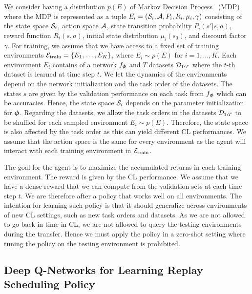 We consider having a distribution $p(E)$ of Markov Decision Process~\cite{bellman1957markovian} (MDP) where the MDP is represented as a tuple $E_i = ({\mathcal{S}}_i, {\mathcal{A}}, P_i, R_i, \mu_i, \gamma)$ consisting of the state space ${\mathcal{S}}_i$, action space ${\mathcal{A}}$, state transition probability $P_i(s' | s, a)$, reward function $R_i(s, a)$, initial state distribution $\mu_i(s_0)$, and discount factor $\gamma$. For training, we assume that we have access to a fixed set of training environments ${\mathcal{E}}_{{\text{train}}} = \{E_1, \dots, E_K\}$, where $E_i \sim p(E)$ for $i=1, ..., K$. Each environment $E_i$ contains of a network $f_{{\bm{\phi}}}$ and $T$ datasets ${\mathcal{D}}_{1:T}$ where the $t$-th dataset is learned at time step $t$. We let the dynamics of the environments depend on the network initialization and the task order of the datasets. The states $s$ are given by the validation performance on each task from $f_{{\bm{\phi}}}$ which can be accuracies. Hence, the state space ${\mathcal{S}}_i$ depends on the parameter initialization for ${\bm{\phi}}$. Regarding the datasets, we allow the task orders in the datasets ${\mathcal{D}}_{1:T}$ to be shuffled for each sampled environment $E_i \sim p(E)$. Therefore, the state space is also affected by the task order as this can yield different CL performances. We assume that the action space is the same for every environment as the agent will interact with each training environment in ${\mathcal{E}}_{{\text{train}}}$. 

The goal for the agent is to maximize the accumulated returns in each training environment. The reward is given by the CL performance. We assume that we have a dense reward that we can compute from the validation sets at each time step $t$. We are therefore after a policy that works well on all environments. The intention for learning such policy is that it should generalize across environments of new CL settings, such as new task orders and datasets. As we are not allowed to go back in time in CL, we are not allowed to query the testing environments during the transfer. Hence we must apply the policy in a zero-shot setting where tuning the policy on the testing environment is prohibited.


\subsection{Deep Q-Networks for Learning Replay Scheduling Policy}

